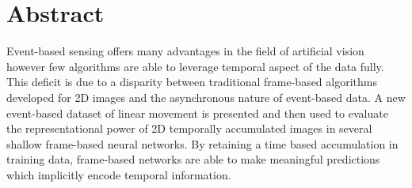 \documentclass[12pt,openany,a4paper]{book}
\begin{document}
\cleardoublepage

\chapter{Abstract}

Event-based sensing offers many advantages in the field of artificial vision however few algorithms are able to leverage temporal aspect of the data fully. 
This deficit is due to a disparity between traditional frame-based algorithms developed for 2D images and the asynchronous nature of event-based data. 
A new event-based dataset of linear movement is presented and then used to evaluate the representational power of 2D temporally accumulated images in several shallow frame-based neural networks. 
By retaining a time based accumulation in training data, frame-based networks are able to make meaningful predictions which implicitly encode temporal information. 

\tableofcontents

\listoffigures

\listoftables

\cleardoublepage

\mainmatter

%       
        









\appendix
\newpage
\mbox{}
\newpage



%

\cleardoublepage
\end{document}
